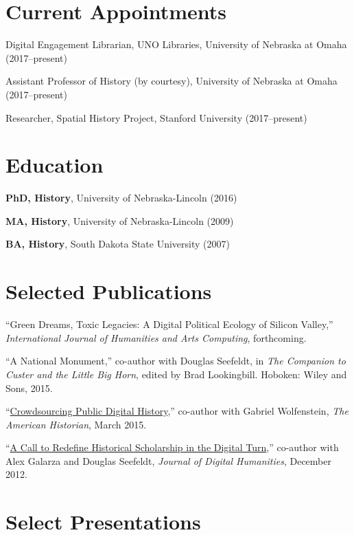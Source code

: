 \section{Current Appointments}\label{current-appointments}

Digital Engagement Librarian, UNO Libraries, University of Nebraska at
Omaha (2017--present)

Assistant Professor of History (by courtesy), University of Nebraska at
Omaha (2017--present)

Researcher, Spatial History Project, Stanford University (2017--present)

\section{Education}\label{education}

\textbf{PhD, History}, University of Nebraska-Lincoln (2016)

\textbf{MA, History}, University of Nebraska-Lincoln (2009)

\textbf{BA, History}, South Dakota State University (2007)

\section{Selected Publications}\label{selected-publications}

``Green Dreams, Toxic Legacies: A Digital Political Ecology of Silicon
Valley,'' \emph{International Journal of Humanities and Arts Computing},
forthcoming.

``A National Monument,'' co-author with Douglas Seefeldt, in \emph{The
Companion to Custer and the Little Big Horn}, edited by Brad
Lookingbill. Hoboken: Wiley and Sons, 2015.

``\href{http://tah.oah.org/content/crowdsourcing-digital-public-history/}{Crowdsourcing
Public Digital History},'' co-author with Gabriel Wolfenstein, \emph{The
American Historian}, March 2015.

``\href{http://journalofdigitalhumanities.org/1-4/a-call-to-redefine-historical-scholarship-in-the-digital-turn/}{A
Call to Redefine Historical Scholarship in the Digital Turn},''
co-author with Alex Galarza and Douglas Seefeldt, \emph{Journal of
Digital Humanities}, December 2012.

\section{Select Presentations}\label{select-presentations}

